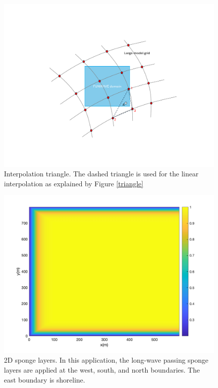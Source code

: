 \documentclass[preprint,10pt]{elsarticle}
\begin{document}
  \begin{figure}
\begin{center}
 \includegraphics[width=1.0\textwidth]{figures/two_grids.pdf}
 \caption{Interpolation triangle. The dashed triangle is used for the linear interpolation as explained by Figure \ref{triangle} }
 \label{two_grid}
 \end{center}
 \end{figure}
 
  \begin{figure}
\begin{center}
 \includegraphics[width=1.0\textwidth]{figures/sponge_2d.jpg}
 \caption{2D sponge layers. In this application, the long-wave passing sponge layers are applied at the west, south, and north boundaries. The east boundary is shoreline. }
 \label{sponge}
 \end{center}
 \end{figure}
 
\end{document}
